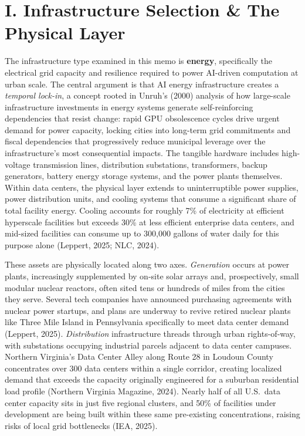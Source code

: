 \documentclass[10pt, twocolumn]{article}
\begin{document}

\section*{I. Infrastructure Selection \& The Physical Layer}

The infrastructure type examined in this memo is \textbf{energy}, specifically the electrical grid capacity and resilience required to power AI-driven computation at urban scale. The central argument is that AI energy infrastructure creates a \textit{temporal lock-in}, a concept rooted in Unruh's (2000) analysis of how large-scale infrastructure investments in energy systems generate self-reinforcing dependencies that resist change: rapid GPU obsolescence cycles drive urgent demand for power capacity, locking cities into long-term grid commitments and fiscal dependencies that progressively reduce municipal leverage over the infrastructure's most consequential impacts. The tangible hardware includes high-voltage transmission lines, distribution substations, transformers, backup generators, battery energy storage systems, and the power plants themselves. Within data centers, the physical layer extends to uninterruptible power supplies, power distribution units, and cooling systems that consume a significant share of total facility energy. Cooling accounts for roughly 7\% of electricity at efficient hyperscale facilities but exceeds 30\% at less efficient enterprise data centers, and mid-sized facilities can consume up to 300,000 gallons of water daily for this purpose alone (Leppert, 2025; NLC, 2024).

These assets are physically located along two axes. \textit{Generation} occurs at power plants, increasingly supplemented by on-site solar arrays and, prospectively, small modular nuclear reactors, often sited tens or hundreds of miles from the cities they serve. Several tech companies have announced purchasing agreements with nuclear power startups, and plans are underway to revive retired nuclear plants like Three Mile Island in Pennsylvania specifically to meet data center demand (Leppert, 2025). \textit{Distribution} infrastructure threads through urban rights-of-way, with substations occupying industrial parcels adjacent to data center campuses. Northern Virginia's Data Center Alley along Route 28 in Loudoun County concentrates over 300 data centers within a single corridor, creating localized demand that exceeds the capacity originally engineered for a suburban residential load profile (Northern Virginia Magazine, 2024). Nearly half of all U.S.\ data center capacity sits in just five regional clusters, and 50\% of facilities under development are being built within these same pre-existing concentrations, raising risks of local grid bottlenecks (IEA, 2025).
\end{document}
